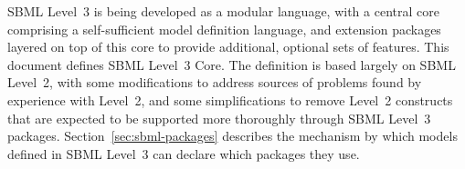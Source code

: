 SBML Level~3 is being developed as a modular language, with a
central core comprising a self-sufficient model definition
language, and extension packages layered on top of this core to
provide additional, optional sets of features.  This document
defines SBML Level~3 Core.  The definition is based largely on
SBML Level~2, with some modifications to address sources of
problems found by experience with Level~2, and some
simplifications to remove Level~2 constructs that are expected to
be supported more thoroughly through SBML Level~3 packages.
Section~\ref{sec:sbml-packages} describes the mechanism by which
models defined in SBML Level~3 can declare which packages they
use.




  
  

